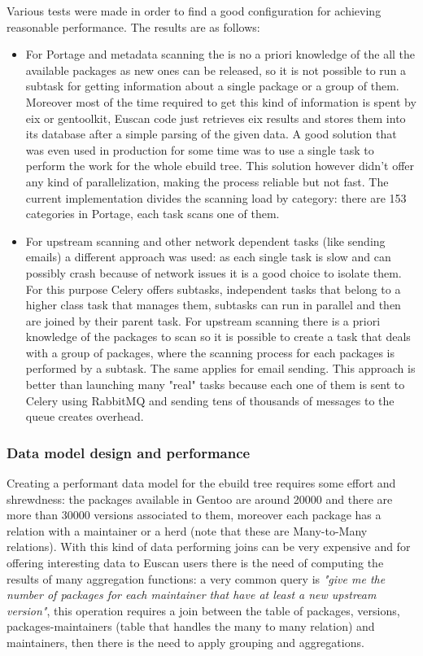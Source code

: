 Various tests were made in order to find a good configuration for achieving reasonable performance. The results are as follows:
\begin{itemize}
\item For Portage and metadata scanning the is no a priori knowledge of the all the available packages as new ones can be released, so it is not possible to run a subtask for getting information about a single package or a group of them. Moreover most of the time required to get this kind of information is spent by eix or gentoolkit, Euscan code just retrieves eix results and stores them into its database after a simple parsing of the given data. A good solution that was even used in production for some time was to use a single task to perform the work for the whole ebuild tree. This solution however didn't offer any kind of parallelization, making the process reliable but not fast. The current implementation divides the scanning load by category:  there are 153 categories in Portage, each task scans one of them.
\item For upstream scanning and other network dependent tasks (like sending emails) a different approach was used: as each single task is slow and can possibly crash because of network issues it is a good choice to isolate them. For this purpose Celery offers subtasks, independent tasks that belong to a higher class task that manages them, subtasks can run in parallel and then are joined by their parent task.
For upstream scanning there is a priori knowledge of the packages to scan so it is possible to create a task that deals with a group of packages, where the scanning process for each packages is performed by a subtask. The same applies for email sending.
This approach is better than launching many "real" tasks because each one of them is sent to Celery using RabbitMQ and sending tens of thousands of messages to the queue creates overhead.
\end{itemize}

\subsubsection{Data model design and performance}
Creating a performant data model for the ebuild tree requires some effort and shrewdness: the packages available in Gentoo are around 20000 and there are more than 30000 versions associated to them, moreover each package has a relation with a maintainer or a herd (note that these are Many-to-Many relations). With this kind of data performing joins can be very expensive and for offering interesting data to Euscan users there is the need of computing the results of many aggregation functions: a very common query is \emph{"give me the number of packages for each maintainer that have at least a new upstream version"}, this operation requires a join between the table of packages, versions, packages-maintainers (table that handles the many to many relation) and maintainers, then there is the need to apply grouping and aggregations.

